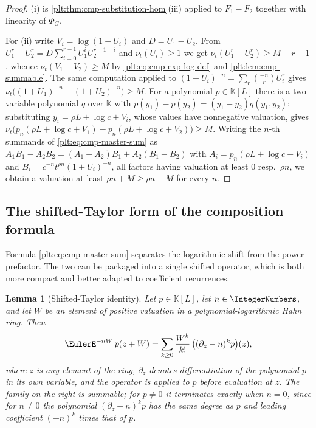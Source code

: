 \documentclass[11pt,oneside]{article}
\theoremstyle{plain}
\newtheorem{lemma}[theorem]{Lemma}
\theoremstyle{definition}
\theoremstyle{remark}
\newcommand{\K}{\mathbb{K}}
\newcommand{\ordt}{\nu_{t}}                              %
\begin{document}
\begin{proof}
(i) is \cref{plt:thm:cmp-substitution-hom}(iii) applied to \(F_1-F_2\)
together with linearity of \(\Phi_G\).

For (ii) write \(V_i=\log(1+U_i)\) and \(D=U_1-U_2\).  From
\(U_1^{r}-U_2^{r}=D\sum_{i=0}^{r-1}U_1^{i}U_2^{r-1-i}\) and
\(\ordt(U_i)\ge1\) we get \(\ordt(U_1^r-U_2^r)\ge M+r-1\), whence
\(\ordt(V_1-V_2)\ge M\) by \eqref{plt:eq:cmp-exp-log-def} and
\cref{plt:lem:cmp-summable}.  The same computation applied to
\((1+U_i)^{-n}=\sum_r\binom{-n}{r}U_i^{r}\) gives
\(\ordt\bigl((1+U_1)^{-n}-(1+U_2)^{-n}\bigr)\ge M\).  For a polynomial
\(p\in\K[L]\) there is a two-variable polynomial \(q\) over \(\K\) with
\(p(y_1)-p(y_2)=(y_1-y_2)q(y_1,y_2)\); substituting
\(y_i=\rho L+\log c+V_i\), whose values have nonnegative valuation, gives
\(\ordt\bigl(p_n(\rho L+\log c+V_1)-p_n(\rho L+\log c+V_2)\bigr)\ge M\).
Writing the \(n\)-th summands of \eqref{plt:eq:cmp-master-sum} as
\(A_1B_1-A_2B_2=(A_1-A_2)B_1+A_2(B_1-B_2)\) with
\(A_i=p_n(\rho L+\log c+V_i)\) and \(B_i=c^{-n}t^{\rho n}(1+U_i)^{-n}\), all
factors having valuation at least \(0\) resp.\ \(\rho n\), we obtain a
valuation at least \(\rho n+M\ge\rho a+M\) for every \(n\).
\end{proof}

\subsection{The shifted-Taylor form of the composition formula}
\label{plt:sec:cmp-shifted-taylor}

Formula \eqref{plt:eq:cmp-master-sum} separates the logarithmic shift from the
power prefactor.  The two can be packaged into a single shifted operator,
which is both more compact and better adapted to coefficient recurrences.

\begin{lemma}[Shifted-Taylor identity]\label{plt:lem:cmp-shifted-taylor}
Let \(p\in\K[L]\), let \(n\in\IntegerNumbers\), and let \(W\) be an element of
positive valuation in a polynomial-logarithmic Hahn ring.  Then
\begin{equation}\label{plt:eq:cmp-shifted-taylor}
 \EulerE^{-nW}\,p(z+W)
 =\sum_{k\ge0}\frac{W^{k}}{k!}\,
   \bigl((\partial_z-n)^{k}p\bigr)(z),
\end{equation}
where \(z\) is any element of the ring, \(\partial_z\) denotes differentiation
of the polynomial \(p\) in its own variable, and the operator is applied to
\(p\) \emph{before} evaluation at \(z\).  The family on the right is summable;
for \(p\ne0\) it terminates exactly when \(n=0\), since for \(n\ne0\) the
polynomial \((\partial_z-n)^{k}p\) has the same degree as \(p\) and leading
coefficient \((-n)^{k}\) times that of \(p\).
\end{lemma}
\end{document}
